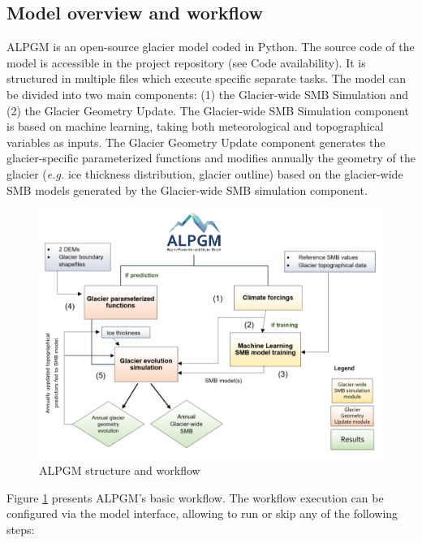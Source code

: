 \subsection{Model overview and workflow} \label{methods:methods:workflow}

ALPGM is an open-source glacier model coded in Python. The source code of the model is accessible in the project repository (see Code availability). It is structured in multiple files which execute specific separate tasks. The model can be divided into two main components: (1) the Glacier-wide SMB Simulation and (2) the Glacier Geometry Update. The Glacier-wide SMB Simulation component is based on machine learning, taking both meteorological and topographical variables as inputs. The Glacier Geometry Update component generates the glacier-specific parameterized functions and modifies annually the geometry of the glacier (\textit{e.g.} ice thickness distribution, glacier outline) based on the glacier-wide SMB models generated by the Glacier-wide SMB simulation component.

\begin{figure}[t]
\centering
\includegraphics[width=14cm]{Figures/methods/Figure_1.png}
\caption{ALPGM structure and workflow}
\label{methods:fig1}
\end{figure}

Figure \ref{methods:fig1} presents ALPGM’s basic workflow. The workflow execution can be configured via the model interface, allowing to run or skip any of the following steps:

